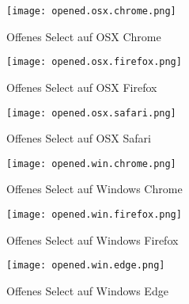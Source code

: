 \begin{figure}[!htb]
    \centering
    \begin{minipage}[b]{0.28\textwidth}
        \centering
        \texttt{[image: opened.osx.chrome.png]}
        \caption{Offenes Select auf OSX Chrome}
        \label{Abbildung:openedOsxChromeSelect}
    \end{minipage}
    \hfill
    \begin{minipage}[b]{0.28\textwidth}
        \centering
        \texttt{[image: opened.osx.firefox.png]}
        \caption{Offenes Select auf OSX Firefox}
        \label{Abbildung:openedOsxFirefoxSelect}
    \end{minipage}
    \hfill
    \begin{minipage}[b]{0.28\textwidth}
        \centering
        \texttt{[image: opened.osx.safari.png]}
        \caption{Offenes Select auf OSX Safari}
        \label{Abbildung:openedOsxSafariSelect}
    \end{minipage}
\end{figure}

\begin{figure}[!htb]
    \centering
    \begin{minipage}[b]{0.28\textwidth}
        \centering
        \texttt{[image: opened.win.chrome.png]}
        \caption{Offenes Select auf Windows Chrome}
        \label{Abbildung:openedWinChromeSelect}
    \end{minipage}
    \hfill
    \begin{minipage}[b]{0.28\textwidth}
        \centering
        \texttt{[image: opened.win.firefox.png]}
        \caption{Offenes Select auf Windows Firefox}
        \label{Abbildung:openedWinFirefoxSelect}
    \end{minipage}
    \hfill
    \begin{minipage}[b]{0.28\textwidth}
        \centering
        \texttt{[image: opened.win.edge.png]}
        \caption{Offenes Select auf Windows Edge}
        \label{Abbildung:openedWinEdgeSelect}
    \end{minipage}
\end{figure}
